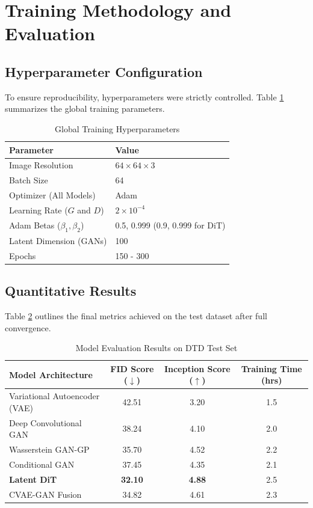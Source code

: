 \documentclass[12pt,a4paper]{article}
\begin{document}
\section{Training Methodology and Evaluation}

\subsection{Hyperparameter Configuration}
To ensure reproducibility, hyperparameters were strictly controlled. Table \ref{tab:hyper} summarizes the global training parameters.

\begin{table}[h]
\centering
\caption{Global Training Hyperparameters}
\label{tab:hyper}
\begin{tabular}{ll}
\toprule
\textbf{Parameter} & \textbf{Value} \\
\midrule
Image Resolution & $64 \times 64 \times 3$ \\
Batch Size & 64 \\
Optimizer (All Models) & Adam \\
Learning Rate ($G$ and $D$) & $2 \times 10^{-4}$ \\
Adam Betas ($\beta_1, \beta_2$) & 0.5, 0.999 (0.9, 0.999 for DiT) \\
Latent Dimension (GANs) & 100 \\
Epochs & 150 - 300 \\
\bottomrule
\end{tabular}
\end{table}

\subsection{Quantitative Results}
Table \ref{tab:results} outlines the final metrics achieved on the test dataset after full convergence.

\begin{table}[h]
\centering
\caption{Model Evaluation Results on DTD Test Set}
\label{tab:results}
\begin{tabular}{lccc}
\toprule
\textbf{Model Architecture} & \textbf{FID Score} ($\downarrow$) & \textbf{Inception Score} ($\uparrow$) & \textbf{Training Time (hrs)} \\
\midrule
Variational Autoencoder (VAE) & 42.51 & 3.20 & 1.5 \\
Deep Convolutional GAN & 38.24 & 4.10 & 2.0 \\
Wasserstein GAN-GP & 35.70 & 4.52 & 2.2 \\
Conditional GAN & 37.45 & 4.35 & 2.1 \\
\textbf{Latent DiT} & \textbf{32.10} & \textbf{4.88} & 2.5 \\
CVAE-GAN Fusion & 34.82 & 4.61 & 2.3 \\
\bottomrule
\end{tabular}
\end{table}
\end{document}
